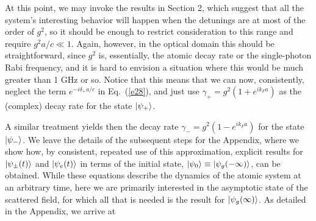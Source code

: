 \documentclass[aps,pra,twocolumn,floatfix,superscriptaddress]{revtex4}
\begin{document}
At this point, we may invoke the results in Section 2, which suggest that all the system's interesting behavior will happen when the detunings are at most of the order of $g^2$, so it should be enough to restrict consideration to this range and require $g^2a/c \ll 1$.  Again, however, in the optical domain this should be straightforward, since $g^2$ is, essentially, the atomic decay rate or the single-photon Rabi frequency, and it is hard to envision a situation where this would be much greater than 1 GHz or so.  Notice that this means that we can now, consistently, neglect the term $e^{-i\delta_+a/c}$ in Eq.~(\ref{e28}), and just use $\gamma_+ = g^2(1 + e^{ik_Fa})$ as the (complex) decay rate for the state $|\psi_{+}\rangle$.  

A similar treatment yields then the decay rate $\gamma_- = g^2(1 - e^{ik_Fa})$ for the state $|\psi_{-}\rangle$.  We leave the details of the subsequent steps for the Appendix, where we show how, by consistent, repeated use of this approximation, explicit results for $|\psi_\pm(t)\rangle$ and $|\psi_e(t)\rangle$ in terms of the initial state, $|\psi_0\rangle \equiv |\psi_g(-\infty)\rangle$, can be obtained.  While these equations describe the dynamics of the atomic system at an arbitrary time, here we are primarily interested in the asymptotic state of the scattered field, for which all that is needed is the result for $|\psi_g(\infty)\rangle$.  As detailed in the Appendix, we arrive at
\end{document}

